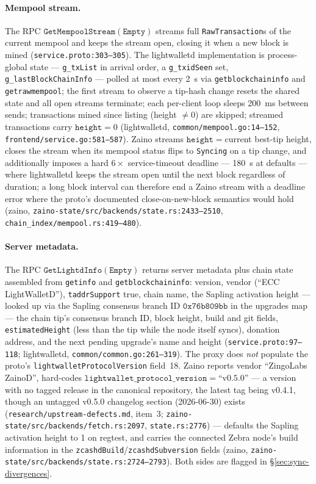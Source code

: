 \documentclass[11pt,a4paper]{article}
\theoremstyle{definition}
\begin{document}
\paragraph{Mempool stream.} The RPC
$\mathtt{GetMempoolStream}(\mathtt{Empty})$ streams full
\texttt{RawTransaction}s of the current mempool and keeps the stream
open, closing it when a new block is mined
(\texttt{service.proto:303--305}). The lightwalletd implementation is
process-global state --- \texttt{g\_txList} in arrival order, a
\texttt{g\_txidSeen} set, \texttt{g\_lastBlockChainInfo} --- polled at
most every 2~s via \texttt{getblockchaininfo} and
\texttt{getrawmempool}; the first stream to observe a tip-hash change
resets the shared state and all open streams terminate; each per-client
loop sleeps 200~ms between sends; transactions mined since listing
(height $\neq 0$) are skipped; streamed transactions carry
$\mathtt{height} = 0$ (\textsf{lightwalletd},
\texttt{common/mempool.go:14--152},
\texttt{frontend/service.go:581--587}). Zaino streams
$\mathtt{height} = {}$current best-tip height, closes the stream when its
mempool status flips to \texttt{Syncing} on a tip change, and
additionally imposes a hard $6 \times$ service-timeout deadline ---
180~s at defaults --- where lightwalletd keeps the stream open until the
next block regardless of duration; a long block interval can therefore
end a Zaino stream with a deadline error where the proto's documented
close-on-new-block semantics would hold (\textsf{zaino},
\texttt{zaino-state/src/backends/state.rs:2433--2510},
\texttt{chain\_index/mempool.rs:419--480}).

\paragraph{Server metadata.} The RPC
$\mathtt{GetLightdInfo}(\mathtt{Empty})$ returns server metadata plus
chain state assembled from \texttt{getinfo} and
\texttt{getblockchaininfo}: version, vendor (``ECC LightWalletD''),
\texttt{taddrSupport} true, chain name, the Sapling activation height ---
looked up via the Sapling consensus branch ID $\mathtt{0x76b809bb}$ in
the upgrades map --- the chain tip's consensus branch ID, block height,
build and git fields, \texttt{estimatedHeight} (less than the tip while
the node itself syncs), donation address, and the next pending upgrade's
name and height (\texttt{service.proto:97--118}; \textsf{lightwalletd},
\texttt{common/common.go:261--319}). The proxy does \emph{not}
populate the proto's \texttt{lightwalletProtocolVersion} field~18. Zaino
reports vendor ``ZingoLabs ZainoD'', hard-codes
$\mathtt{lightwallet\_protocol\_version} = \text{``v0.5.0''}$ --- a
version with no tagged release in the canonical repository, the latest
tag being v0.4.1, though an untagged v0.5.0 changelog section
(2026-06-30) exists (\texttt{research/upstream-defects.md}, item~3;
\texttt{zaino-state/src/backends/fetch.rs:2097},
\texttt{state.rs:2776}) --- defaults the Sapling activation height to 1
on regtest, and
carries the connected Zebra node's build information in the
\texttt{zcashdBuild}/\texttt{zcashdSubversion} fields (\textsf{zaino},
\texttt{zaino-state/src/backends/state.rs:2724--2793}). Both sides are
flagged in \S\ref{sec:sync-divergences}.
\end{document}
